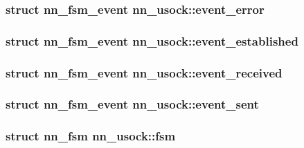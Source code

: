 \subsubsection[{event\+\_\+error}]{\setlength{\rightskip}{0pt plus 5cm}struct {\bf nn\+\_\+fsm\+\_\+event} nn\+\_\+usock\+::event\+\_\+error}\hypertarget{structnn__usock_a00fa9612c702d6f3f97439326b53b617}{}\label{structnn__usock_a00fa9612c702d6f3f97439326b53b617}
\subsubsection[{event\+\_\+established}]{\setlength{\rightskip}{0pt plus 5cm}struct {\bf nn\+\_\+fsm\+\_\+event} nn\+\_\+usock\+::event\+\_\+established}\hypertarget{structnn__usock_a3bea73503d270099926b2e38b66d08f2}{}\label{structnn__usock_a3bea73503d270099926b2e38b66d08f2}
\subsubsection[{event\+\_\+received}]{\setlength{\rightskip}{0pt plus 5cm}struct {\bf nn\+\_\+fsm\+\_\+event} nn\+\_\+usock\+::event\+\_\+received}\hypertarget{structnn__usock_ad88294c9778826548ec88eb0d7ec1789}{}\label{structnn__usock_ad88294c9778826548ec88eb0d7ec1789}
\subsubsection[{event\+\_\+sent}]{\setlength{\rightskip}{0pt plus 5cm}struct {\bf nn\+\_\+fsm\+\_\+event} nn\+\_\+usock\+::event\+\_\+sent}\hypertarget{structnn__usock_a00d977a2443f72c36d498caada54cec2}{}\label{structnn__usock_a00d977a2443f72c36d498caada54cec2}
\subsubsection[{fsm}]{\setlength{\rightskip}{0pt plus 5cm}struct {\bf nn\+\_\+fsm} nn\+\_\+usock\+::fsm}\hypertarget{structnn__usock_a98c2a6282c489b65549e456c79dcf765}{}\label{structnn__usock_a98c2a6282c489b65549e456c79dcf765}
